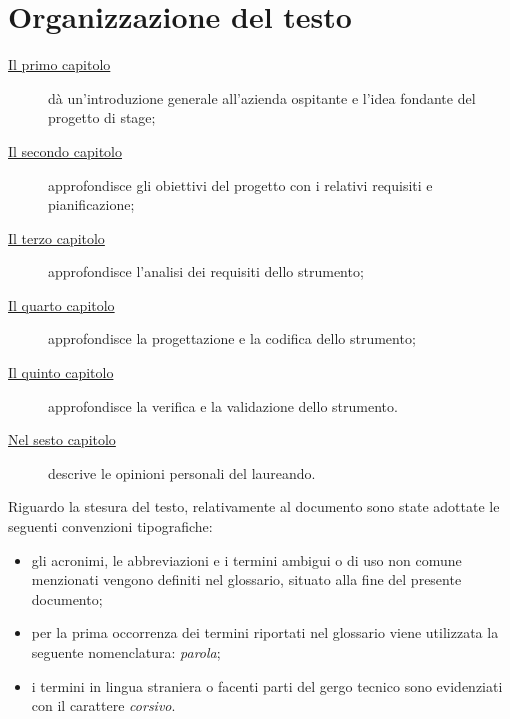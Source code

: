 
\section{Organizzazione del testo}\label{sec:organizzazione-del-testo}
\begin{description}
    \item[{\hyperref[ch:introduzione]{Il primo capitolo}}] dà un'introduzione generale all'azienda ospitante e l'idea fondante del progetto di stage;

    \item[{\hyperref[ch:descrizione-stage]{Il secondo capitolo}}] approfondisce gli obiettivi del progetto con i relativi requisiti e pianificazione;

    \item[{\hyperref[ch:analisi-requisiti]{Il terzo capitolo}}] approfondisce l'analisi dei requisiti dello strumento;

    \item[{\hyperref[ch:progettazione-e-codifica]{Il quarto capitolo}}] approfondisce la progettazione e la codifica dello strumento;

    \item[{\hyperref[ch:verifica-validazione]{Il quinto capitolo}}] approfondisce la verifica e la validazione dello strumento.

    \item[{\hyperref[ch:conclusioni]{Nel sesto capitolo}}] descrive le opinioni personali del laureando.
\end{description}

Riguardo la stesura del testo, relativamente al documento sono state adottate le seguenti convenzioni tipografiche:
\begin{itemize}
	\item gli acronimi, le abbreviazioni e i termini ambigui o di uso non comune menzionati vengono definiti nel glossario, situato alla fine del presente documento;
	\item per la prima occorrenza dei termini riportati nel glossario viene utilizzata la seguente nomenclatura: \emph{parola}\glsfirstoccur;
	\item i termini in lingua straniera o facenti parti del gergo tecnico sono evidenziati con il carattere \emph{corsivo}.
\end{itemize}
